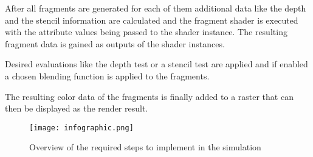 After all fragments are generated for each of them additional data like the depth and the stencil information are calculated and the fragment shader is executed with the attribute values being passed to the shader instance. The resulting fragment data is gained as outputs of the shader instances.

Desired evaluations like the depth test or a stencil test are applied and if enabled a chosen blending function is applied to the fragments.

The resulting color data of the fragments is finally added to a raster that can then be displayed as the render result.

\begin{figure}[h!]
  \centering 
  \texttt{[image: infographic.png]}
  \caption{Overview of the required steps to implement in the simulation}
  \label{fig:infographic}
\end{figure}


